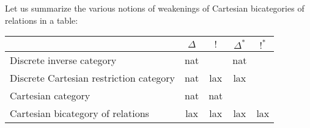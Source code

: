 Let us summarize the various notions of weakenings of Cartesian bicategories of relations in a table:


\hfil
\begin{tabular}{l|cccc}
                                                     & $\Delta$          & $!$             & $\Delta^*$         & $!^*$\\
\hline
Discrete inverse category            & nat &  & nat  & \\
Discrete Cartesian restriction category      & nat &  lax  & lax \\
Cartesian category                                      & nat & nat &   \\
Cartesian bicategory of relations & lax  & lax & lax & lax \\
\end{tabular}
